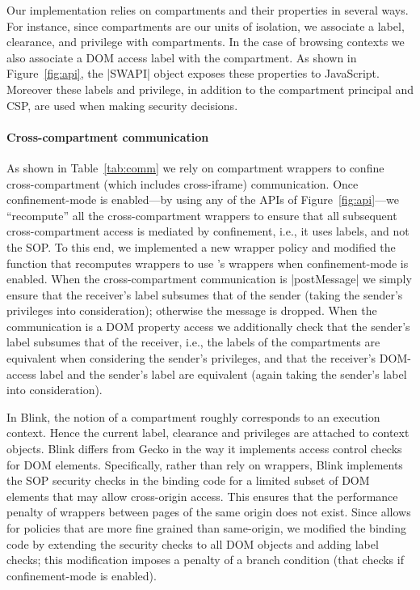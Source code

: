 Our implementation relies on compartments and their properties in
several ways.
%
For instance, since compartments are our units of isolation, we
associate a label, clearance, and privilege with compartments.
%
In the case of browsing contexts we also associate a DOM access label
with the compartment.
%
As shown in Figure~\ref{fig:api}, the \js|SWAPI| object exposes these
properties to JavaScript.
% 
Moreover these labels and privilege, in addition to the compartment
principal and CSP, are used when making security decisions.

\paragraph{Cross-compartment communication}
%
As shown in Table~\ref{tab:comm} we rely on compartment wrappers to
confine cross-compartment (which includes cross-iframe) communication.
%
Once confinement-mode is enabled---by using any of the APIs of
Figure~\ref{fig:api}---we ``recompute'' all the cross-compartment
wrappers to ensure that all subsequent cross-compartment access is
mediated by confinement, i.e., it uses labels, and not the SOP.
%
To this end, we implemented a new wrapper policy and modified the
function that recomputes wrappers to use \sys{}'s wrappers when
confinement-mode is enabled.
%
When the cross-compartment communication is \js|postMessage| we simply
ensure that the receiver's label subsumes that of the sender (taking
the sender's privileges into consideration); otherwise the message is
dropped.
%
When the communication is a DOM property access we additionally check
that the sender's label subsumes that of the receiver, i.e., the labels of
the compartments are equivalent when considering the sender's
privileges, and that the receiver's DOM-access label and the sender's
label are equivalent (again taking the sender's label into
consideration).

In Blink, the notion of a compartment roughly corresponds to an
execution context.
%
Hence the current label, clearance and privileges are attached to
context objects.
%
Blink differs from Gecko in the way it implements access control checks for
DOM elements. 
%
Specifically, rather than rely on wrappers, Blink implements the SOP
security checks in the binding code for a limited subset of DOM
elements that may allow cross-origin access.
%
This ensures that the performance penalty of wrappers between pages of the same
origin does not exist.
%
Since \sys{} allows for policies that are more fine grained than
same-origin, we modified the binding code by extending the security
checks to all DOM objects and adding label checks; this modification
imposes a penalty of a branch condition (that checks if
confinement-mode is enabled).

